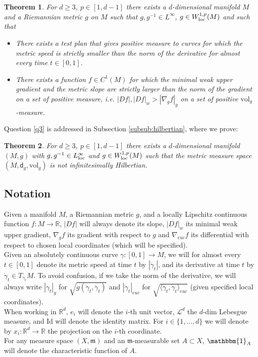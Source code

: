\documentclass[a4paper,10pt]{article}
\newtheorem{maintheorem}{Theorem}
\numberwithin{equation}{section}
\newcommand{\R}{\mathbb{R}}
\newcommand{\vol}{\mathrm{vol}}
\newcommand{\sfd}{\mathsf d}
\begin{document}
\begin{maintheorem}\label{snd_counterexample}
    For $d \geq 3$, $p \in [1, d-1]$ there exists a $d$-dimensional manifold $M$ and a Riemannian metric $g$ on $M$ such that $g, g^{-1} \in L^\infty$, $g \in W^{1,p}_{\rm loc}(M)$ and such that 
    \begin{itemize}
        \item[(i)] There exists a test plan that gives positive measure to curves for which the metric speed is strictly smaller than the norm of the derivative for almost every time $t \in [0,1]$. 
        \item[(ii)] There exists a function $f \in C^1(M)$ for which the minimal weak upper gradient and the metric slope are strictly larger than the norm of the gradient on a set of positive measure, i.e. $|Df|, |Df|_w > |\nabla_g f|_g$ on a set of positive $\vol_g$-measure.
    \end{itemize}
\end{maintheorem}
Question \ref{q3} is addressed in Subsection \ref{subsub:hilbertian}, where we prove:
\smallskip

\begin{maintheorem}\label{hilbertianity_counterexample}
    For $d\geq 3$, $p\in [1, d-1]$ there exists a $d$-dimensional manifold $(M, g)$ with $g, g^{-1} \in L^\infty_{\rm loc}$ and $g \in W^{1,p}_{\rm loc}(M)$ such that the metric measure space $(M, \sfd_g, \vol_g)$ is not infinitesimally Hilbertian.
\end{maintheorem}
\subsection*{Notation} 
Given a manifold $M$, a Riemannian metric $g$, and a locally Lipschitz continuous function $f:M \to \R$, $|Df|$ will always denote its slope, $|Df|_w$ its minimal weak upper gradient, $\nabla_gf$ its gradient with respect to $g$ and $\nabla_{euc} f$ its differential with respect to chosen local coordinates (which will be specified). \\
Given an absolutely continuous curve $\gamma:[0,1] \to M$, we will for almost every $t \in [0,1]$ denote its metric speed at time $t$ by $|\dot{\gamma}_t|$, and its derivative at time $t$ by $\dot{\gamma}_t \in T_{\gamma_t}M$. To avoid confusion, if we take the norm of the derivative, we will always write $|\dot{\gamma}_t|_g$ for $\sqrt{g(\dot{\gamma}_t,\dot{\gamma}_t)}$ and $|\dot{\gamma}_t|_{euc}$ for $\sqrt{\langle\dot{\gamma}_t,\dot{\gamma}_t\rangle_{euc}}$ (given specified local coordinates). \\
When working in $\R^d$, $e_i$ will denote the $i$-th unit vector, $\mathcal{L}^d$ the $d$-dim Lebesgue measure, and $\mathrm{Id}$ will denote the identity matrix. For $i \in \{1, \ldots, d\}$ we will denote by $x_i: \R^d \to \R$ the projection on the $i$-th coordinate. \\
For any measure space $(X, \mathfrak{m})$ and an $\mathfrak{m}$-measurable set $A \subset X$, $\mathbbm{1}_{A}$ will denote the characteristic function of $A$. 
\end{document}
